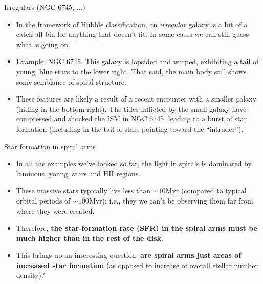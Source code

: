 \documentclass[letterpaper,landscape]{slides}
\begin{document}
\begin{slide}
\begin{center}
{\large \color{red} 
                  Irregulars (NGC 6745, ...)  }
\end{center}

\begin{itemize}
\item In the framework of Hubble classification, an {\em irregular} galaxy
is a bit of a catch-all bin for anything that doesn't fit. In some cases we
can still guess what is going on.

\item Example: NGC 6745. This galaxy is lopsided and warped, exhibiting a
tail of young, blue stars to the lower right. That said, the main body still
shows some semblance of spiral structure.

\item These features are likely a result of a recent encounter with a
smaller galaxy (hiding in the bottom right). The tides inflicted by the
small galaxy have compressed and shocked the ISM in NGC 6745, leading to a
burst of star formation (including in the tail of stars pointing toward the
``intruder'').

\end{itemize}

\vfill
\end{slide}


\begin{slide}
\begin{center}
{\large \color{red} 
                  Star formation in spiral arms  }
\end{center}

\begin{itemize}
\item In all the examples we've looked so far, the light in spirals is
dominated by luminous, young, stars and HII regions.

\item These massive stars typically live less than $\sim 10$Myr (compared to
typical orbital periods of $\sim 100$Myr); i.e., they we can't be observing
them far from where they were created.

\item Therefore, {\bf the star-formation rate (SFR) in the spiral arms must
be much higher than in the rest of the disk}.

\item {\color{blue} This brings up an interesting question: {\bf are spiral arms just areas of
increased star formation} (as opposed to increase of overall stellar number
density)?}

\end{itemize}

\vfill
\end{slide}
\end{document}
